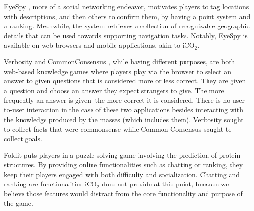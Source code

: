 \documentclass[preprint,authoryear,12pt]{elsarticle}
\makeatletter
\renewcommand{\paragraph}{\@startsection{paragraph}{4}{\z@}%
  {-3.25ex\@plus -1ex \@minus -.2ex}%
  {1.5ex \@plus .2ex}%
  {\normalfont\normalsize\mdseries}}
\makeatother
\begin{document}

EyeSpy \citep{Bell:2009}, more of a social networking endeavor, motivates players to tag locations with descriptions, and then others to confirm them, by having a point system and a ranking. Meanwhile, the system retrieves a collection of recognizable geographic details that can be used towards supporting navigation tasks. Notably, EyeSpy is available on web-browsers and mobile applications, akin to iCO$_2$.


Verbosity \citep{vonAhnVerb:2006} and CommonConsensus \citep{lieberman2007}, while having different purposes, are both web-based knowledge games where players play via the browser to select an answer to given questions that is considered more or less correct. They are given a question and choose an answer they expect strangers to give. The more frequently an answer is given, the more correct it is considered. There is no user-to-user interaction in the case of these two applications besides interacting with the knowledge produced by the masses (which includes them). Verbosity sought to collect facts that were commonsense while Common Consensus sought to collect goals.


Foldit \citep{cooper2010predicting} puts players in a puzzle-solving game involving the prediction of protein structures. By providing online functionalities such as chatting or ranking, they keep their players engaged with both difficulty and socialization. Chatting and ranking are functionalities iCO$_2$ does not provide at this point, because we believe those features would distract from the core functionality and purpose of the game.

\end{document}
